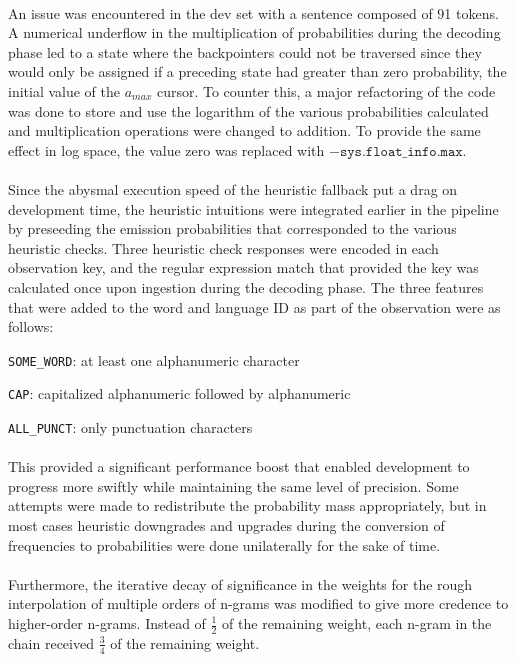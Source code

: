 \documentclass[11pt,a4paper]{article}
\begin{document}
\paragraph{}
An issue was encountered in the dev set with a sentence composed of 91 tokens. A numerical
underflow in the multiplication of probabilities during the decoding phase led to a state
where the backpointers could not be traversed since they would only be assigned if a
preceding state had greater than zero probability, the initial value of the $a_{max}$
cursor. To counter this, a major refactoring of the code was done to store and use
the logarithm of the various probabilities calculated and multiplication operations
were changed to addition. To provide the same effect in log space, the value zero
was replaced with $-\texttt{sys.float\_info.max}$.

\paragraph{}
Since the abysmal execution speed  of the heuristic fallback put a drag on development time,
the heuristic intuitions were integrated earlier in the pipeline by preseeding the
emission probabilities that corresponded to the various heuristic checks. Three
heuristic check responses were encoded in each observation key, and the regular
expression match that provided the key was calculated once upon ingestion during
the decoding phase. The three features that were added to the word and language ID
as part of the observation were as follows:

\itemize
\item{\texttt{SOME\_WORD}: at least one alphanumeric character}
\item{\texttt{CAP}: capitalized alphanumeric followed by alphanumeric}
\item{\texttt{ALL\_PUNCT}: only punctuation characters }

\paragraph{}
This provided a significant performance boost that enabled development to progress
more swiftly while maintaining the same level of precision. Some attempts were made to
redistribute the probability mass appropriately, but in most cases heuristic downgrades
and upgrades during the conversion of frequencies to probabilities were done unilaterally
for the sake of time.

\paragraph{}
Furthermore, the iterative decay of significance in the weights for the rough
interpolation of multiple orders of n-grams was modified to give more credence
to higher-order n-grams. Instead of $\frac{1}{2}$ of the remaining weight, each n-gram
in the chain received $\frac{3}{4}$ of the remaining weight.
\end{document}
